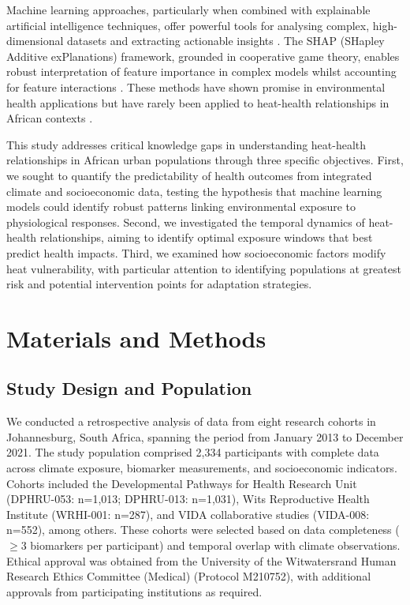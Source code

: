 \documentclass[11pt,a4paper]{article}
\begin{document}
Machine learning approaches, particularly when combined with explainable artificial intelligence techniques, offer powerful tools for analysing complex, high-dimensional datasets and extracting actionable insights \citep{Rajkomar2019, Beam2021}. The SHAP (SHapley Additive exPlanations) framework, grounded in cooperative game theory, enables robust interpretation of feature importance in complex models whilst accounting for feature interactions \citep{Lundberg2017, Lundberg2020}. These methods have shown promise in environmental health applications but have rarely been applied to heat-health relationships in African contexts \citep{Nori2019, Chen2022}.

This study addresses critical knowledge gaps in understanding heat-health relationships in African urban populations through three specific objectives. First, we sought to quantify the predictability of health outcomes from integrated climate and socioeconomic data, testing the hypothesis that machine learning models could identify robust patterns linking environmental exposure to physiological responses. Second, we investigated the temporal dynamics of heat-health relationships, aiming to identify optimal exposure windows that best predict health impacts. Third, we examined how socioeconomic factors modify heat vulnerability, with particular attention to identifying populations at greatest risk and potential intervention points for adaptation strategies.

\section{Materials and Methods}

\subsection{Study Design and Population}

We conducted a retrospective analysis of data from eight research cohorts in Johannesburg, South Africa, spanning the period from January 2013 to December 2021. The study population comprised 2,334 participants with complete data across climate exposure, biomarker measurements, and socioeconomic indicators. Cohorts included the Developmental Pathways for Health Research Unit (DPHRU-053: n=1,013; DPHRU-013: n=1,031), Wits Reproductive Health Institute (WRHI-001: n=287), and VIDA collaborative studies (VIDA-008: n=552), among others. These cohorts were selected based on data completeness ($\geq$3 biomarkers per participant) and temporal overlap with climate observations. Ethical approval was obtained from the University of the Witwatersrand Human Research Ethics Committee (Medical) (Protocol M210752), with additional approvals from participating institutions as required.
\end{document}
